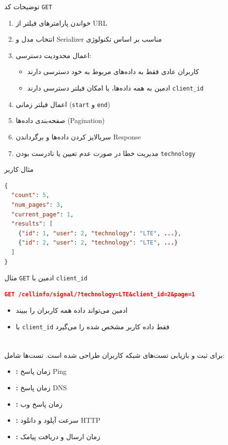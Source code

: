 \documentclass{report}
\begin{document}
توضیحات کد  \texttt{GET}
\begin{enumerate}
    \item خواندن پارامترهای فیلتر از URL
    \item انتخاب مدل و Serializer مناسب بر اساس تکنولوژی
    \item اعمال محدودیت دسترسی:
    \begin{itemize}
        \item کاربران عادی فقط به داده‌های مربوط به خود دسترسی دارند  
        \item ادمین به همه داده‌ها، با امکان فیلتر دسترسی دارند  \texttt{client\_id}
    \end{itemize}
    \item اعمال فیلتر زمانی (\texttt{start} و \texttt{end})
    \item صفحه‌بندی داده‌ها (Pagination)
    \item سریالایز کردن داده‌ها و برگرداندن Response
    \item مدیریت خطا در صورت عدم تعیین یا نادرست بودن \texttt{technology}
\end{enumerate}

مثال \texttt{} کاربر
\begin{lstlisting}[language=json]
{
  "count": 5,
  "num_pages": 3,
  "current_page": 1,
  "results": [
    {"id": 1, "user": 2, "technology": "LTE", ...},
    {"id": 2, "user": 2, "technology": "LTE", ...}
  ]
}
\end{lstlisting}

مثال \texttt{GET} ادمین با \texttt{client\_id}
\begin{lstlisting}[language=json]
GET /cellinfo/signal/?technology=LTE&client_id=2&page=1
\end{lstlisting}
\begin{itemize}
    \item ادمین می‌تواند داده همه کاربران را ببیند
    \item با \texttt{client\_id} فقط داده کاربر مشخص شده را می‌گیرد
\end{itemize}








\section{}
 برای ثبت و بازیابی تست‌های شبکه کاربران طراحی شده است. تست‌ها شامل:
\begin{itemize}
    \item \textbf{:} زمان پاسخ Ping
    \item \textbf{:} زمان پاسخ DNS
    \item \textbf{:} زمان پاسخ وب
    \item \textbf{:} سرعت آپلود و دانلود HTTP
    \item \textbf{:} زمان ارسال و دریافت پیامک
\end{itemize}
\end{document}
